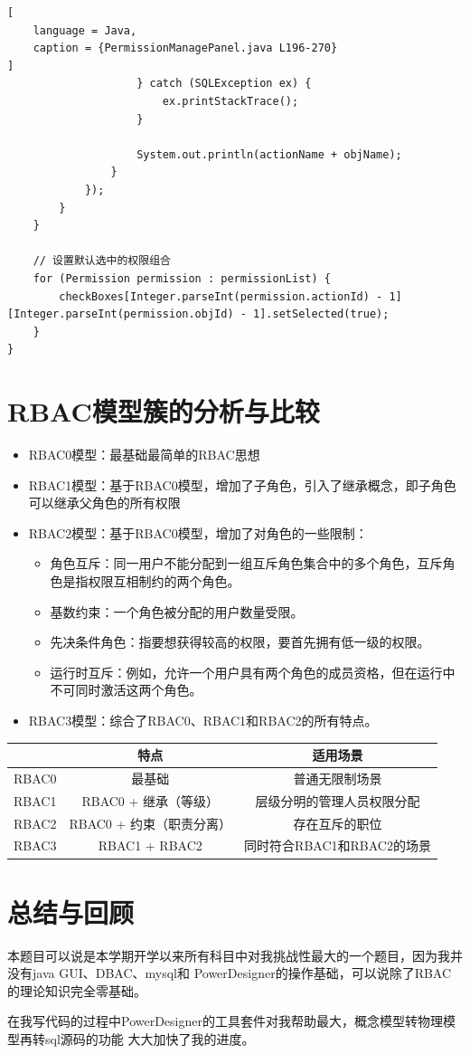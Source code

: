 \documentclass[12pt, a4paper, oneside]{ctexart}
\begin{document}
\begin{lstlisting}[
    language = Java,
    caption = {PermissionManagePanel.java L196-270}
]
                    } catch (SQLException ex) {
                        ex.printStackTrace();
                    }

                    System.out.println(actionName + objName);
                }
            });
        }
    }

    // 设置默认选中的权限组合
    for (Permission permission : permissionList) {
        checkBoxes[Integer.parseInt(permission.actionId) - 1][Integer.parseInt(permission.objId) - 1].setSelected(true);
    }
}    
\end{lstlisting}

\section{RBAC模型簇的分析与比较}

\begin{itemize}
    \item RBAC0模型：最基础最简单的RBAC思想
    \item RBAC1模型：基于RBAC0模型，增加了子角色，引入了继承概念，即子角色可以继承父角色的所有权限
    \item RBAC2模型：基于RBAC0模型，增加了对角色的一些限制：
    \begin{itemize}
        \item 角色互斥：同一用户不能分配到一组互斥角色集合中的多个角色，互斥角色是指权限互相制约的两个角色。
        \item 基数约束：一个角色被分配的用户数量受限。
        \item 先决条件角色：指要想获得较高的权限，要首先拥有低一级的权限。
        \item 运行时互斥：例如，允许一个用户具有两个角色的成员资格，但在运行中不可同时激活这两个角色。
    \end{itemize}
    \item RBAC3模型：综合了RBAC0、RBAC1和RBAC2的所有特点。
\end{itemize}

\begin{table}[H]
    \centering
    \begin{tabular}{|l|c|c|}
        \hline
            & 特点               & 适用场景               \\ \hline
        RBAC0 & 最基础              & 普通无限制场景            \\ \hline
        RBAC1 & RBAC0 + 继承（等级）   & 层级分明的管理人员权限分配      \\ \hline
        RBAC2 & RBAC0 + 约束（职责分离） & 存在互斥的职位            \\ \hline
        RBAC3 & RBAC1 + RBAC2    & 同时符合RBAC1和RBAC2的场景 \\ \hline
    \end{tabular}
\end{table}

\section{总结与回顾}

本题目可以说是本学期开学以来所有科目中对我挑战性最大的一个题目，因为我并没有java GUI、DBAC、mysql和
PowerDesigner的操作基础，可以说除了RBAC的理论知识完全零基础。

在我写代码的过程中PowerDesigner的工具套件对我帮助最大，概念模型转物理模型再转sql源码的功能
大大加快了我的进度。
\end{document}
